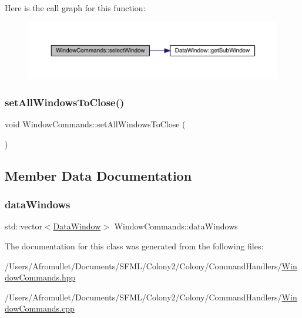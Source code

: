 Here is the call graph for this function\+:
\nopagebreak
\begin{figure}[H]
\begin{center}
\leavevmode
\includegraphics[width=350pt]{da/d07/class_window_commands_a0e61beaebffb12c489ee277b84f74248_cgraph}
\end{center}
\end{figure}
\mbox{\label{class_window_commands_ac52c784736000a50d4d8ab43e0255f71}} 
\subsubsection{\texorpdfstring{set\+All\+Windows\+To\+Close()}{setAllWindowsToClose()}}
{\footnotesize\ttfamily void Window\+Commands\+::set\+All\+Windows\+To\+Close (\begin{DoxyParamCaption}{ }\end{DoxyParamCaption})}



\subsection{Member Data Documentation}
\mbox{\label{class_window_commands_aaa04e997ba5d2b2042cbe565c80cafbb}} 
\subsubsection{\texorpdfstring{data\+Windows}{dataWindows}}
{\footnotesize\ttfamily std\+::vector$<$\mbox{\hyperlink{class_data_window}{Data\+Window}}$>$ Window\+Commands\+::data\+Windows}



The documentation for this class was generated from the following files\+:\begin{DoxyCompactItemize}
\item 
/\+Users/\+Afromullet/\+Documents/\+S\+F\+M\+L/\+Colony2/\+Colony/\+Command\+Handlers/\mbox{\hyperlink{_window_commands_8hpp}{Window\+Commands.\+hpp}}\item 
/\+Users/\+Afromullet/\+Documents/\+S\+F\+M\+L/\+Colony2/\+Colony/\+Command\+Handlers/\mbox{\hyperlink{_window_commands_8cpp}{Window\+Commands.\+cpp}}\end{DoxyCompactItemize}
